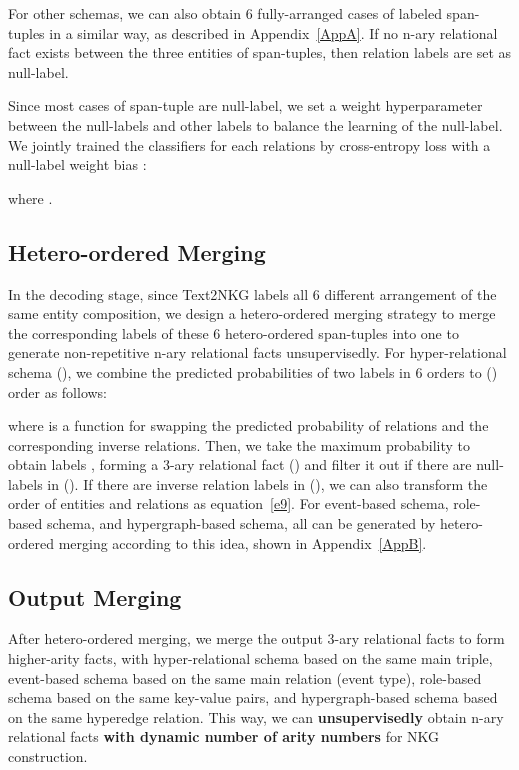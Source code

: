 \documentclass{article} \usepackage{iclr2024_conference,times}
\begin{document}
For other schemas, we can also obtain 6 fully-arranged cases of labeled span-tuples in a similar way, as described in Appendix~\ref{AppA}. If no n-ary relational fact exists between the three entities of span-tuples, then relation labels are set as null-label.

Since most cases of span-tuple are null-label, we set a weight hyperparameter  between the null-labels and other labels to balance the learning of the null-label. We jointly trained the  classifiers for each relations by cross-entropy loss  with a null-label weight bias : 

where .




\subsection{Hetero-ordered Merging}
In the decoding stage, since Text2NKG labels all 6 different arrangement of the same entity composition, we design a hetero-ordered merging strategy to merge the corresponding labels of these 6 hetero-ordered span-tuples into one to generate non-repetitive n-ary relational facts unsupervisedly. For hyper-relational schema (), we combine the predicted probabilities of two labels  in 6 orders to () order as follows:

where  is a function for swapping the predicted probability of relations and the corresponding inverse relations. Then, we take the maximum probability to obtain labels , forming a 3-ary relational fact () and filter it out if there are null-labels in (). If there are inverse relation labels in (), we can also transform the order of entities and relations as equation~\ref{e9}. For event-based schema, role-based schema, and hypergraph-based schema, all can be generated by hetero-ordered merging according to this idea, shown in Appendix~\ref{AppB}.

\subsection{Output Merging}
After hetero-ordered merging, we merge the output 3-ary relational facts to form higher-arity facts, with hyper-relational schema based on the same main triple, event-based schema based on the same main relation (event type), role-based schema based on the same key-value pairs, and hypergraph-based schema based on the same hyperedge relation. This way, we can \textbf{unsupervisedly} obtain n-ary relational facts \textbf{with dynamic number of arity numbers} for NKG construction. 
\end{document}
